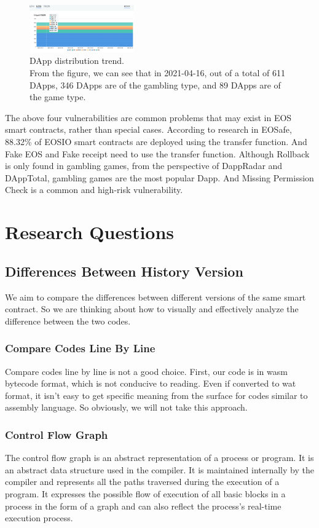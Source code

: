 \documentclass[a4paper, 10pt, conference, twocolumn]{ieeeconf}       %
\begin{document}
\begin{figure}[h]
    \centering
    \includegraphics[width=0.4\textwidth]{figures/dapptotal.png}
    \caption{DApp distribution trend. \\ From the figure, we can see that in 2021-04-16, out of a total of 611 DApps, 346 DApps are of the gambling type, and 89 DApps are of the game type.}
\end{figure}

The above four vulnerabilities are common problems that may exist in EOS smart contracts,
rather than special cases.
According to research in EOSafe, 88.32\% of EOSIO smart contracts are deployed using the transfer function.
And Fake EOS and Fake receipt need to use the transfer function.
Although Rollback is only found in gambling games,
from the perspective of DappRadar\cite{DappRadar} and DAppTotal\cite{DAppTotal},
gambling games are the most popular Dapp.
And Missing Permission Check is a common and high-risk vulnerability.

\section{Research Questions}


\subsection{Differences Between History Version}

We aim to compare the differences between different versions of the same smart contract.
So we are thinking about how to visually and effectively analyze the difference between the two codes.

\subsubsection{Compare Codes Line By Line}
Compare codes line by line is not a good choice. First,
our code is in wasm bytecode format, which is not conducive to reading.
Even if converted to wat format,
it isn't easy to get specific meaning from the surface for codes similar to assembly language.
So obviously, we will not take this approach.

\subsubsection{Control Flow Graph}
The control flow graph is an abstract representation of a process or program.
It is an abstract data structure used in the compiler.
It is maintained internally by the compiler and represents all the paths traversed during the execution of a program. It expresses the possible flow of execution of all basic blocks in a process in the form of a graph
and can also reflect the process's real-time execution process.
\end{document}
